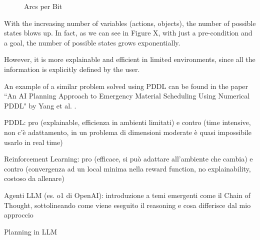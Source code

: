 \begin{figure}[h!]
  \centering
  \qquad {}
  \caption{Arcs per Bit}
\end{figure}

With the increasing number of variables (actions, objects), the number of
possible states blows up. In fact, as we can see in Figure X, with just a pre-condition
and a goal, the number of possible states grows exponentially.

However, it is more explainable and efficient in limited environments, since all
the information is explicitly defined by the user.

An example of a similar problem solved using PDDL can be found in the paper ``An
AI Planning Approach to Emergency Material Scheduling Using Numerical PDDL" by Yang
et al. \cite{Yang2022}.

PDDL: pro (explainable, efficienza in ambienti limitati) e contro (time intensive,
non c'è adattamento, in un problema di dimensioni moderate è quasi impossibile usarlo
in real time)

Reinforcement Learning: pro (efficace, si può adattare all'ambiente che cambia) e
contro (convergenza ad un local minima nella reward function, no explainability,
costoso da allenare)

Agenti LLM (es. o1 di OpenAI): introduzione a temi emergenti come il Chain of
Thought, sottolineando come viene eseguito il reasoning e cosa differisce dal mio
approccio

Planning in LLM